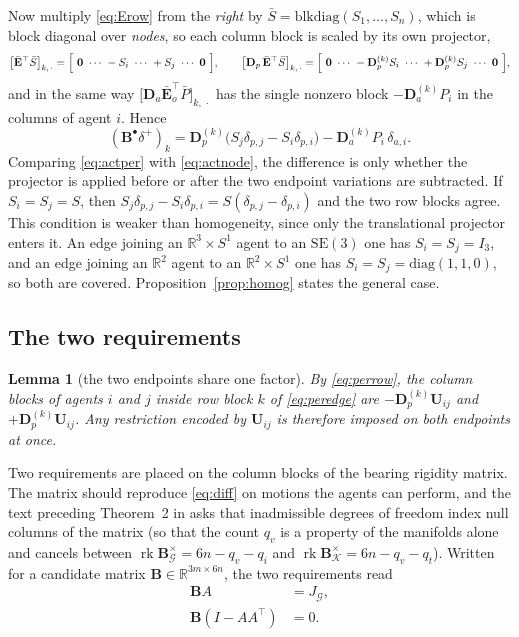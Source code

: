 \documentclass[11pt,a4paper]{article}
\theoremstyle{plain}
\newtheorem{lemma}{Lemma}
\theoremstyle{definition}
\newcommand{\R}{\mathbb{R}}
\newcommand{\SEthree}{\mathrm{SE}(3)}
\newcommand{\rank}{\operatorname{rk}}
\newcommand{\Bper}{\mathbf{B}^{\times}}
\newcommand{\Bnode}{\mathbf{B}^{\bullet}}
\newcommand{\Ebar}{\bar{\mathbf{E}}}
\newcommand{\Ebaro}{\bar{\mathbf{E}}_o}
\newcommand{\Dp}{\mathbf{D}_p}
\newcommand{\Da}{\mathbf{D}_a}
\begin{document}
Now multiply \eqref{eq:Erow} from the \emph{right} by
$\bar S=\mathrm{blkdiag}(S_1,\dots,S_n)$, which is block diagonal over
\emph{nodes}, so each column block is scaled by its own projector,
\begin{equation}\label{eq:noderow}
  \bigl[\Ebar^\top\bar S\bigr]_{k,\,\cdot}
  =\Bigl[\ \mathbf 0\ \cdots\ -S_i\ \cdots\ +S_j\ \cdots\ \mathbf 0\ \Bigr],
  \qquad
  \bigl[\Dp\,\Ebar^\top\bar S\bigr]_{k,\,\cdot}
  =\Bigl[\ \mathbf 0\ \cdots\ -\Dp^{(k)}S_i\ \cdots\ +\Dp^{(k)}S_j\ \cdots\ \mathbf 0\ \Bigr],
\end{equation}
and in the same way
$\bigl[\Da\Ebaro^\top\bar P\bigr]_{k,\,\cdot}$ has the single nonzero block
$-\Da^{(k)}P_i$ in the columns of agent $i$. Hence
\begin{equation}\label{eq:actnode}
  (\Bnode\delta^+)_k
  =\Dp^{(k)}\bigl(S_j\delta_{p,j}-S_i\delta_{p,i}\bigr)
   -\Da^{(k)}P_i\,\delta_{a,i}.
\end{equation}
Comparing \eqref{eq:actper} with \eqref{eq:actnode}, the difference is only
whether the projector is applied before or after the two endpoint variations
are subtracted. If $S_i=S_j=S$, then
$S_j\delta_{p,j}-S_i\delta_{p,i}=S(\delta_{p,j}-\delta_{p,i})$ and the two row
blocks agree. This condition is weaker than homogeneity, since only the
translational projector enters it. An edge joining an $\R^3\times S^1$ agent to
an $\SEthree$ one has $S_i=S_j=I_3$, and an edge joining an $\R^2$ agent to an
$\R^2\times S^1$ one has $S_i=S_j=\mathrm{diag}(1,1,0)$, so both are covered.
Proposition~\ref{prop:homog} states the general case.

\subsection*{The two requirements}

\begin{lemma}[the two endpoints share one factor]\label{lem:same}
By \eqref{eq:perrow}, the column blocks of agents $i$ and $j$ inside row block
$k$ of \eqref{eq:peredge} are $-\Dp^{(k)}\mathbf U_{ij}$ and
$+\Dp^{(k)}\mathbf U_{ij}$. Any restriction encoded by $\mathbf U_{ij}$ is
therefore imposed on both endpoints at once.
\end{lemma}

Two requirements are placed on the column blocks of the bearing rigidity
matrix. The matrix should reproduce \eqref{eq:diff} on motions the agents can
perform, and the text preceding Theorem~2 in \cite{michieletto2021} asks that
inadmissible degrees of freedom index null columns of the matrix (so that the
count $q_v$ is a property of the manifolds alone and cancels between
$\rank\Bper_{\mathcal G}=6n-q_v-q_i$ and
$\rank\Bper_{\mathcal K}=6n-q_v-q_t$). Written for a candidate matrix
$\mathbf B\in\R^{3m\times6n}$, the two requirements read
\begin{align}
  \mathbf BA&=J_{\mathcal G}, \tag{F}\label{eq:F}\\
  \mathbf B(I-AA^\top)&=0. \tag{Z}\label{eq:Z}
\end{align}
\end{document}
